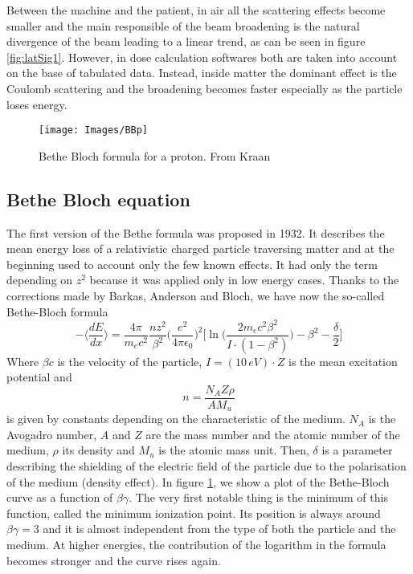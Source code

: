 \documentclass[12pt, a4paper, twoside]{book}
\begin{document}
Between the machine and the patient, in air all the scattering effects become smaller and the main responsible of the beam broadening is the natural divergence of the beam leading to a linear trend, as can be seen in figure \ref{fig:latSig1}.
However, in dose calculation softwares both are taken into account on the base of tabulated data. Instead, inside matter the dominant effect is the Coulomb scattering and the broadening becomes faster especially as the particle loses energy.

\begin{figure}[!ht]
{\texttt{[image: Images/BBp]}}
\caption{Bethe Bloch formula for a proton. From Kraan \cite{Kra:range}}
\label{fig:BB}
\end{figure}

\subsection{Bethe Bloch equation}
The first version of the Bethe formula was proposed in 1932. It describes the mean energy loss of a relativistic charged particle traversing matter and at the beginning used to account only the few known effects. It had only the term depending on $z^2$ because it was applied only in low energy cases.
Thanks to the corrections made by Barkas, Anderson and Bloch, we have now the so-called Bethe-Bloch formula
\[
-\bigg\langle\frac{dE}{dx}\bigg\rangle= \frac{4\pi}{m_ec^2}\frac{nz^2}{\beta^2}\bigg(\frac{e^2}{4\pi\epsilon_0} \bigg)^2\bigg[\ln{\bigg(\frac{2m_ec^2\beta^2}{I\cdot(1-\beta^2)}\bigg)}-\beta^2 -\frac{\delta}{2}\bigg]
\]
Where $\beta c$ is the velocity of the particle, $I=(10\,eV)\cdot Z$ is the mean excitation potential and 
\[
n = \frac{N_AZ\rho}{AM_u}
\]
is given by constants depending on the characteristic of the medium. $N_A$ is the Avogadro number, $A$ and $Z$ are the mass number and the atomic number of the medium, $\rho$ its density and $M_u$ is the atomic mass unit. Then, $\delta$ is a parameter describing the shielding of the electric field of the particle due to the polarisation of the medium (density effect).
In figure \ref{fig:BB}, we show a plot of the Bethe-Bloch curve as a function of $\beta\gamma$. The very first notable thing is the minimum of this function, called the minimum ionization point. Its position is always around $\beta\gamma=3$ and it is almost independent from the type of both the particle and the medium. At higher energies, the contribution of the logarithm in the formula becomes stronger and the curve rises again.
\end{document}
